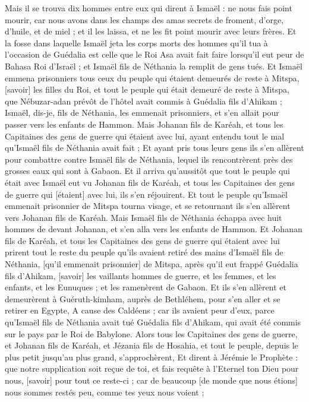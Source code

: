 \begin{multicols}{2}
Mais il se trouva dix hommes entre eux qui dirent à Ismaël : ne nous fais point mourir, car nous avons dans les champs des amas secrets de froment, d'orge, d'huile, et de miel ; et il les laissa, et ne les fit point mourir avec leurs frères.
Et la fosse dans laquelle Ismaël jeta les corps morts des hommes qu'il tua à l'occasion de Guédalia est celle que le Roi Asa avait fait faire lorsqu'il eut peur de Bahasa Roi d'Israël ; et Ismaël fils de Néthania la remplit de gens tués.
Et Ismaël emmena prisonniers tous ceux du peuple qui étaient demeurés de reste à Mitspa, [savoir] les filles du Roi, et tout le peuple qui était demeuré de reste à Mitspa, que Nébuzar-adan prévôt de l'hôtel avait commis à Guédalia fils d'Ahikam ; Ismaël, dis-je, fils de Néthania, les emmenait prisonniers, et s'en allait pour passer vers les enfants de Hammon.
Mais Johanan fils de Karéah, et tous les Capitaines des gens de guerre qui étaient avec lui, ayant entendu tout le mal qu'Ismaël fils de Néthania avait fait ;
Et ayant pris tous leurs gens ils s'en allèrent pour combattre contre Ismaël fils de Néthania, lequel ils rencontrèrent près des grosses eaux qui sont à Gabaon.
Et il arriva qu'aussitôt que tout le peuple qui était avec Ismaël eut vu Johanan fils de Karéah, et tous les Capitaines des gens de guerre qui [étaient] avec lui, ils s'en réjouirent.
Et tout le peuple qu'Ismaël emmenait prisonnier de Mitspa tourna visage, et se retournant ils s'en allèrent vers Johanan fils de Karéah.
Mais Ismaël fils de Néthania échappa avec huit hommes de devant Johanan, et s'en alla vers les enfants de Hammon.
Et Johanan fils de Karéah, et tous les Capitaines des gens de guerre qui étaient avec lui prirent tout le reste du peuple qu'ils avaient retiré des mains d'Ismaël fils de Néthania, [qu'il emmenait prisonnier] de Mitspa, après qu'il eut frappé Guédalia fils d'Ahikam, [savoir] les vaillants hommes de guerre, et les femmes, et les enfants, et les Eunuques ; et les ramenèrent de Gabaon.
Et ils s'en allèrent et demeurèrent à Guéruth-kimham, auprès de Bethléhem, pour s'en aller et se retirer en Egypte,
A cause des Caldéens ; car ils avaient peur d'eux, parce qu'Ismaël fils de Néthania avait tué Guédalia fils d'Ahikam, qui avait été commis sur le pays par le Roi de Babylone.
\VerseOne{}Alors tous les Capitaines des gens de guerre, et Johanan fils de Karéah, et Jézania fils de Hosahia, et tout le peuple, depuis le plus petit jusqu’au plus grand, s'approchèrent,
Et dirent à Jérémie le Prophète : que notre supplication soit reçue de toi, et fais requête à l'Eternel ton Dieu pour nous, [savoir] pour tout ce reste-ci ; car de beaucoup [de monde que nous étions] nous sommes restés peu, comme tes yeux nous voient ;

\end{multicols}
